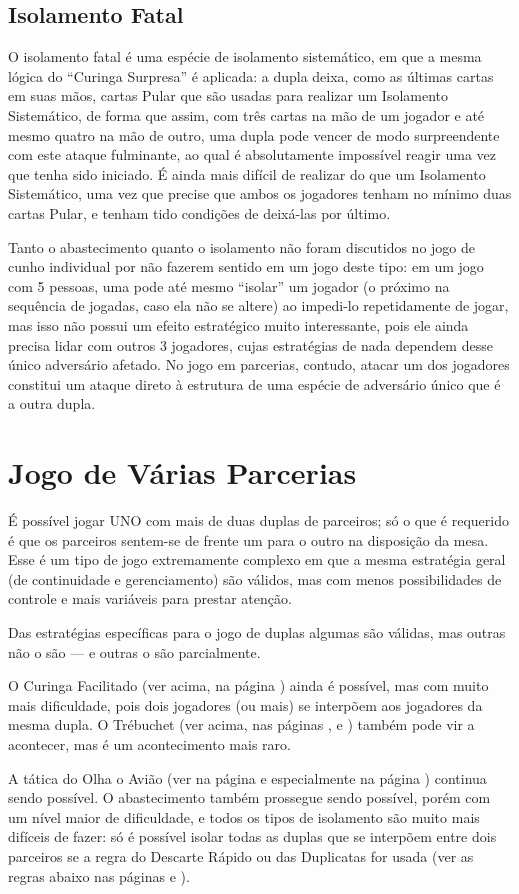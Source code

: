 \subsection{Isolamento Fatal}

O isolamento fatal é uma espécie de isolamento sistemático, em que a mesma lógica do ``Curinga Surpresa'' é aplicada: a dupla deixa, como as últimas cartas em suas mãos, cartas Pular que são usadas para realizar um Isolamento Sistemático, de forma que assim, com três cartas na mão de um jogador e até mesmo quatro na mão de outro, uma dupla pode vencer de modo surpreendente com este ataque fulminante, ao qual é absolutamente impossível reagir uma vez que tenha sido iniciado. É ainda mais difícil de realizar do que um Isolamento Sistemático, uma vez que precise que ambos os jogadores tenham no mínimo duas cartas Pular, e tenham tido condições de deixá-las por último.

Tanto o abastecimento quanto o isolamento não foram discutidos no jogo de cunho individual por não fazerem sentido em um jogo deste tipo: em um jogo com 5 pessoas, uma pode até mesmo ``isolar'' um jogador (o próximo na sequência de jogadas, caso ela não se altere) ao impedi-lo repetidamente de jogar, mas isso não possui um efeito estratégico muito interessante, pois ele ainda precisa lidar com outros 3 jogadores, cujas estratégias de nada dependem desse único adversário afetado. No jogo em parcerias, contudo, atacar um dos jogadores constitui um ataque direto à estrutura de uma espécie de adversário único que é a outra dupla.

\section{Jogo de Várias Parcerias}

É possível jogar UNO com mais de duas duplas de parceiros; só o que é requerido é que os parceiros sentem-se de frente um para o outro na disposição da mesa. Esse é um tipo de jogo extremamente complexo em que a mesma estratégia geral (de continuidade e gerenciamento) são válidos, mas com menos possibilidades de controle  e mais variáveis para prestar atenção.

Das estratégias específicas para o jogo de duplas algumas são válidas, mas outras não o são --- e outras o são parcialmente. 

O Curinga Facilitado (ver acima, na página \pageref{curingafacil}) ainda é possível, mas com muito mais dificuldade, pois dois jogadores (ou mais) se interpõem aos jogadores da mesma dupla. O Trébuchet (ver acima, nas páginas \pageref{trebuchetlongo}, \pageref{trebuchetcurto} e \pageref{trebuchetduplo}) também pode vir a acontecer, mas é um acontecimento mais raro.

A tática do Olha o Avião (ver na página \pageref{aviaolongo} e especialmente na página \pageref{aviaocurto}) continua sendo possível. O abastecimento também prossegue sendo possível, porém com um nível maior de dificuldade, e todos os tipos de isolamento são muito mais difíceis de fazer: só é possível isolar todas as duplas que se interpõem entre dois parceiros se a regra do Descarte Rápido ou das Duplicatas for usada (ver as regras abaixo nas páginas \pageref{descarterapido} e \pageref{duplicatas}).